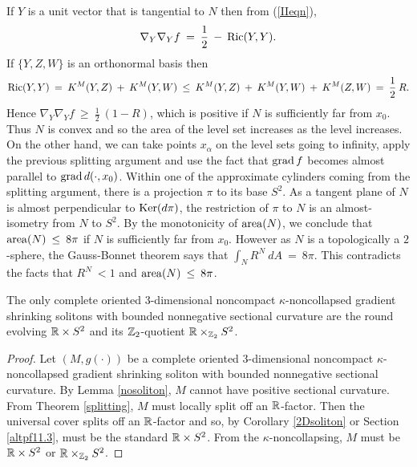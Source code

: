 If $Y$ is a unit vector that is tangential to $N$ then from (\ref{IIeqn}),
\begin{equation}
\nabla_Y \nabla_Y f \: = \: \frac12 \: - \: \operatorname{Ric}(Y,Y).
\end{equation}
If $\{Y, Z, W\}$ is an orthonormal basis then
\begin{equation}
\operatorname{Ric}(Y, Y) \: = \: K^M(Y,Z) \: + \: K^M(Y, W) \: \le \:
K^M(Y,Z) \: + \: K^M(Y, W) \: + \: K^M(Z, W) \: = \: \frac12 \: R.
\end{equation}
Hence $\nabla_Y \nabla_Y f \: \ge \: \frac12 \: (1-R)$, which is
positive if $N$ is sufficiently far from $x_0$. Thus $N$ is convex
and so
the area of the level set increases as the level increases.
On the other hand,
we can take points $x_\alpha$ on the level sets going to
infinity, apply the previous splitting argument
and use the fact that $\operatorname{grad} f$ becomes almost parallel to
$\operatorname{grad} d(\cdot, x_0)$. Within one of the approximate cylinders coming from the
splitting argument, there is a projection $\pi$ to its base $S^2$. As
a tangent plane of $N$ is almost perpendicular to $\operatorname{Ker}(d\pi)$,
the restriction of $\pi$ to $N$ is an almost-isometry from
$N$ to $S^2$.
By the monotonicity of $\operatorname{area}(N)$, we conclude that
$\operatorname{area}(N) \: \le \: 8\pi$ if $N$ is sufficiently far from $x_0$.
However as $N$ is a topologically a $2$-sphere,
the Gauss-Bonnet theorem says that
$\int_N R^N \: dA \: = \: 8\pi$. This contradicts the facts that
$R^N \: < 1$ and $\operatorname{area}(N) \: \le \: 8\pi$.
\endgroup\par\medskip

\begin{corollary}
  \label{cor:kl-three-dimensional-noncompact-noncollapsed-gradient-shrinkers-standard-compactness-kappa-solutions}
 \label{cornosoliton}
The only complete oriented $3$-dimensional noncompact
$\kappa$-noncollapsed gradient shrinking solitons with
bounded nonnegative sectional curvature are the round
evolving ${\mathbb R} \times S^2$ and its ${\mathbb Z}_2$-quotient
${\mathbb R} \times_{{\mathbb Z}_2} S^2$.
\end{corollary}
\begin{proof}
Let $(M, g(\cdot))$ be a complete oriented $3$-dimensional noncompact
$\kappa$-noncollapsed gradient shrinking soliton with
bounded nonnegative sectional curvature. By Lemma \ref{nosoliton}, $M$ cannot
have positive sectional curvature.  From Theorem \ref{splitting},
$M$ must locally split off an ${\mathbb R}$-factor.  Then the universal cover splits
off an ${\mathbb R}$-factor and so, by Corollary \ref{2Dsoliton} or Section
\ref{altpf11.3}, must be the standard ${\mathbb R} \times S^2$. From the
$\kappa$-noncollapsing, $M$ must be ${\mathbb R} \times S^2$ or ${\mathbb R} \times_{{\mathbb Z}_2} S^2$.
\end{proof}

